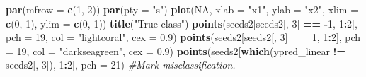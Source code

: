 \documentclass[ignorenonframetext,]{beamer}
\newenvironment{Shaded}{\begin{snugshade}}{\end{snugshade}}
\newcommand{\KeywordTok}[1]{\textcolor[rgb]{0.13,0.29,0.53}{\textbf{#1}}}
\newcommand{\DataTypeTok}[1]{\textcolor[rgb]{0.13,0.29,0.53}{#1}}
\newcommand{\DecValTok}[1]{\textcolor[rgb]{0.00,0.00,0.81}{#1}}
\newcommand{\FloatTok}[1]{\textcolor[rgb]{0.00,0.00,0.81}{#1}}
\newcommand{\StringTok}[1]{\textcolor[rgb]{0.31,0.60,0.02}{#1}}
\newcommand{\CommentTok}[1]{\textcolor[rgb]{0.56,0.35,0.01}{\textit{#1}}}
\newcommand{\OtherTok}[1]{\textcolor[rgb]{0.56,0.35,0.01}{#1}}
\newcommand{\OperatorTok}[1]{\textcolor[rgb]{0.81,0.36,0.00}{\textbf{#1}}}
\newcommand{\NormalTok}[1]{#1}
\begin{document}
\begin{frame}[fragile]

\footnotesize

\begin{Shaded}
\begin{Highlighting}[]
\KeywordTok{par}\NormalTok{(}\DataTypeTok{mfrow =} \KeywordTok{c}\NormalTok{(}\DecValTok{1}\NormalTok{, }\DecValTok{2}\NormalTok{))}
\KeywordTok{par}\NormalTok{(}\DataTypeTok{pty =} \StringTok{"s"}\NormalTok{)}
\KeywordTok{plot}\NormalTok{(}\OtherTok{NA}\NormalTok{, }\DataTypeTok{xlab =} \StringTok{"x1"}\NormalTok{, }\DataTypeTok{ylab =} \StringTok{"x2"}\NormalTok{, }\DataTypeTok{xlim =} \KeywordTok{c}\NormalTok{(}\DecValTok{0}\NormalTok{, }\DecValTok{1}\NormalTok{), }\DataTypeTok{ylim =} \KeywordTok{c}\NormalTok{(}\DecValTok{0}\NormalTok{, }\DecValTok{1}\NormalTok{))}
\KeywordTok{title}\NormalTok{(}\StringTok{"True class"}\NormalTok{)}
\KeywordTok{points}\NormalTok{(seeds2[seeds2[, }\DecValTok{3}\NormalTok{] }\OperatorTok{==}\StringTok{ }\OperatorTok{-}\DecValTok{1}\NormalTok{, }\DecValTok{1}\OperatorTok{:}\DecValTok{2}\NormalTok{], }\DataTypeTok{pch =} \DecValTok{19}\NormalTok{, }\DataTypeTok{col =} \StringTok{"lightcoral"}\NormalTok{, }
    \DataTypeTok{cex =} \FloatTok{0.9}\NormalTok{)}
\KeywordTok{points}\NormalTok{(seeds2[seeds2[, }\DecValTok{3}\NormalTok{] }\OperatorTok{==}\StringTok{ }\DecValTok{1}\NormalTok{, }\DecValTok{1}\OperatorTok{:}\DecValTok{2}\NormalTok{], }\DataTypeTok{pch =} \DecValTok{19}\NormalTok{, }\DataTypeTok{col =} \StringTok{"darkseagreen"}\NormalTok{, }
    \DataTypeTok{cex =} \FloatTok{0.9}\NormalTok{)}
\KeywordTok{points}\NormalTok{(seeds2[}\KeywordTok{which}\NormalTok{(ypred_linear }\OperatorTok{!=}\StringTok{ }\NormalTok{seeds2[, }\DecValTok{3}\NormalTok{]), }\DecValTok{1}\OperatorTok{:}\DecValTok{2}\NormalTok{], }\DataTypeTok{pch =} \DecValTok{21}\NormalTok{)  }\CommentTok{#Mark misclassification.}


\end{Highlighting}
\end{Shaded}
\end{frame}
\end{document}
